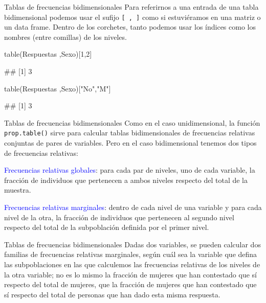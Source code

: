 \documentclass[
  ignorenonframetext,
  aspectratio=169]{beamer}
\newenvironment{Shaded}{\begin{snugshade}}{\end{snugshade}}
\newcommand{\DecValTok}[1]{\textcolor[rgb]{0.00,0.00,0.81}{#1}}
\newcommand{\FunctionTok}[1]{\textcolor[rgb]{0.00,0.00,0.00}{#1}}
\newcommand{\NormalTok}[1]{#1}
\newcommand{\StringTok}[1]{\textcolor[rgb]{0.31,0.60,0.02}{#1}}
\let\oldverbatim\verbatim
\let\endoldverbatim\endverbatim
\renewenvironment{verbatim}{\tiny\oldverbatim}{\endoldverbatim}
\newcommand\blue[1]{\textcolor{blue}{#1}}
\begin{document}
\begin{frame}[fragile]{Tablas de frecuencias bidimensionales}
\protect\hypertarget{tablas-de-frecuencias-bidimensionales-2}{}
Para referirnos a una entrada de una tabla bidimensional podemos usar el
sufijo \texttt{{[}\ ,\ {]}} como si estuviéramos en una matriz o un data
frame. Dentro de los corchetes, tanto podemos usar los índices como los
nombres (entre comillas) de los niveles.

\begin{Shaded}
\begin{Highlighting}[]
\FunctionTok{table}\NormalTok{(Respuestas ,Sexo)[}\DecValTok{1}\NormalTok{,}\DecValTok{2}\NormalTok{]}
\end{Highlighting}
\end{Shaded}

\begin{verbatim}
## [1] 3
\end{verbatim}

\begin{Shaded}
\begin{Highlighting}[]
\FunctionTok{table}\NormalTok{(Respuestas ,Sexo)[}\StringTok{"No"}\NormalTok{,}\StringTok{"M"}\NormalTok{]}
\end{Highlighting}
\end{Shaded}

\begin{verbatim}
## [1] 3
\end{verbatim}
\end{frame}

\begin{frame}[fragile]{Tablas de frecuencias bidimensionales}
\protect\hypertarget{tablas-de-frecuencias-bidimensionales-3}{}
Como en el caso unidimensional, la función \texttt{prop.table()} sirve
para calcular tablas bidimensionales de frecuencias relativas conjuntas
de pares de variables. Pero en el caso bidimensional tenemos dos tipos
de frecuencias relativas:

\blue{Frecuencias relativas globales}: para cada par de niveles, uno de
cada variable, la fracción de individuos que pertenecen a ambos niveles
respecto del total de la muestra.

\blue{Frecuencias relativas marginales}: dentro de cada nivel de una
variable y para cada nivel de la otra, la fracción de individuos que
pertenecen al segundo nivel respecto del total de la subpoblación
definida por el primer nivel.
\end{frame}

\begin{frame}{Tablas de frecuencias bidimensionales}
\protect\hypertarget{tablas-de-frecuencias-bidimensionales-4}{}
Dadas dos variables, se pueden calcular dos familias de frecuencias
relativas marginales, según cuál sea la variable que defina las
subpoblaciones en las que calculemos las frecuencias relativas de los
niveles de la otra variable; no es lo mismo la fracción de mujeres que
han contestado que sí respecto del total de mujeres, que la fracción de
mujeres que han contestado que sí respecto del total de personas que han
dado esta misma respuesta.
\end{frame}
\end{document}
